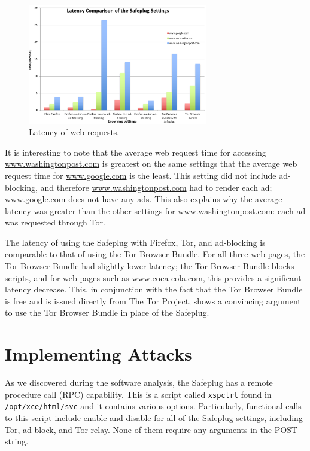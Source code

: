 \documentclass[conference]{IEEEtran}
\begin{document}
\begin{figure}[htb]
\begin{center}
\includegraphics[width=0.7\textwidth]{latency2}
\caption{Latency of web requests.}
\label{fig:latency2}
\end{center}
\end{figure}

It is interesting to note that the average web request time for accessing \url{www.washingtonpost.com} is greatest on the same settings that the average web request time for \url{www.google.com} is the least. This setting did not include ad-blocking, and therefore \url{www.washingtonpost.com} had to render each ad; \url{www.google.com} does not have any ads.  This also explains why the average latency was greater than the other settings for \url{www.washingtonpost.com}: each ad was requested through Tor.   

The latency of using the Safeplug with Firefox, Tor, and ad-blocking is comparable to that of using the Tor Browser Bundle.  For all three web pages, the Tor Browser Bundle had slightly lower latency; the Tor Browser Bundle blocks scripts, and for web pages such as \url{www.coca-cola.com}, this provides a significant latency decrease.  This, in conjunction with the fact that the Tor Browser Bundle is free and is issued directly from The Tor Project, shows a convincing argument to use the Tor Browser Bundle in place of the Safeplug.  

\section{Implementing Attacks}
As we discovered during the software analysis, the Safeplug has a remote procedure call (RPC) capability.  This is a script called \verb!xspctrl! found in \verb!/opt/xce/html/svc! and it contains various options.  Particularly, functional calls to this script include enable and disable for all of the Safeplug settings, including Tor, ad block, and Tor relay.  None of them require any arguments in the POST string.
\end{document}
